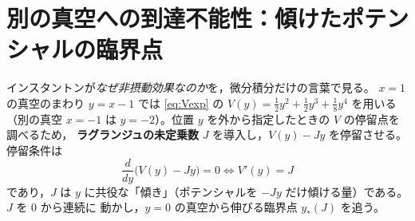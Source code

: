 \documentclass[dvipdfmx, uplatex]{jsarticle}
\theoremstyle{definition}
\begin{document}
\section{別の真空への到達不能性：傾けたポテンシャルの臨界点}
インスタントンが\emph{なぜ非摂動効果なのか}を，微分積分だけの言葉で見る。
$x=1$ の真空のまわり $y=x-1$ では \eqref{eq:Vexp} の $V(y)=\tfrac12y^2+\tfrac12y^3+\tfrac18y^4$ を用いる
（別の真空 $x=-1$ は $y=-2$）。位置 $y$ を外から指定したときの $V$ の停留点を調べるため，
\textbf{ラグランジュの未定乗数} $J$ を導入し，$V(y)-Jy$ を停留させる。停留条件は
\[
    \frac{d}{dy}\bigl(V(y)-Jy\bigr)=0\iff V'(y)=J
\]
であり，$J$ は $y$ に共役な「傾き」（ポテンシャルを $-Jy$ だけ傾ける量）である。$J$ を $0$ から連続に
動かし，$y=0$ の真空から伸びる臨界点 $y_*(J)$ を追う。
\end{document}
